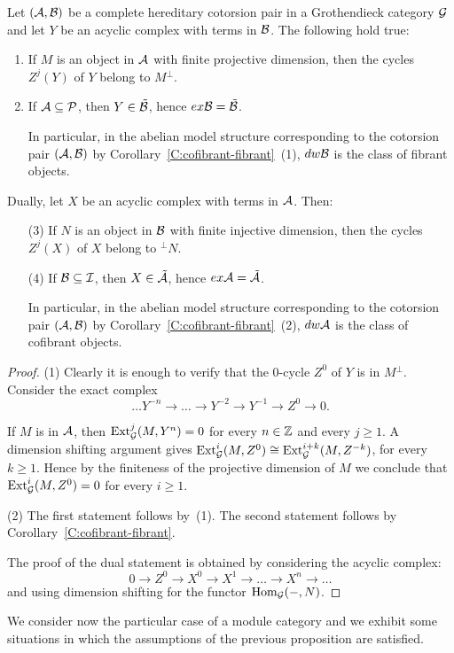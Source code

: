   \begin{prop}\label{P:finite-proj-dim} Let $(\mathcal{A}, \mathcal{B})$ be a complete hereditary cotorsion pair in a Grothendieck category $\mathcal{G}$ and let $Y$ be an acyclic complex with terms in $\mathcal{B}$. The following hold true:
  \begin{enumerate}
  \item If $M$ is an object in $\mathcal{A}$ with finite projective dimension, then the cycles $Z^j(Y)$ of $Y$ belong to $M{}^\perp{}$.
  \item If $\mathcal{A}\subseteq \mathcal{P}$, then $Y\in \tilde {\mathcal{B}}$, hence $ex\mathcal{B}=\tilde {\mathcal{B}}$.

    In particular, in the abelian model structure corresponding to the cotorsion pair $(\mathcal{A}, \mathcal{B})$ by Corollary~\ref{C:cofibrant-fibrant}~(1), $dw \mathcal{B}$ is the class of fibrant objects.
  \end{enumerate}

   Dually, let $X$ be an acyclic complex with terms in $\mathcal{A}$. Then:
   \begin{enumerate}
  \item[(3)] If $N$ is an object in $\mathcal{B}$ with finite injective dimension, then the cycles $Z^j(X)$ of $X$ belong to ${^\perp N}$.
  \item[(4)] If $\mathcal{B}\subseteq \mathcal{I}$, then $X\in \tilde {\mathcal{A}}$, hence $ex\mathcal{A}=\tilde {\mathcal{A}}$.

    In particular, in the abelian model structure corresponding to the cotorsion pair $(\mathcal{A}, \mathcal{B})$ by Corollary~\ref{C:cofibrant-fibrant}~(2), $dw \mathcal{A}$ is the class of cofibrant objects.

  \end{enumerate}

  \end{prop}

  \begin{proof} (1) Clearly it is enough to verify that the $0$-cycle $Z^0$ of $Y$ is in $M{}^\perp{}$.  Consider the exact complex
  \[\dots Y^{-n}\to\dots  \to Y^{-2}\to Y^{-1}\to Z^0\to 0.\]
  \begin{sloppypar}
  If $M$ is in $ \mathcal{A}$, then $\operatorname{Ext}^j_{\mathcal{G}}(M, Y^n)=0$ for every $n\in \mathbb{Z}$ and every $j\geq 1$. A dimension shifting argument gives ${\operatorname{Ext}^i_{\mathcal{G}}(M, Z^0)\cong \operatorname{Ext}^{i+k}_{\mathcal{G}}(M, Z^{-k})}$, for every $k\geq 1$. Hence by the finiteness of the projective dimension of $M$   we conclude that $\operatorname{Ext}^i_{\mathcal{G}}(M, Z^0)=0$ for every $i\geq 1$.
  \end{sloppypar}

 (2) The first statement  follows by~(1). The second statement follows by Corollary~\ref{C:cofibrant-fibrant}.

 The proof of the dual statement is obtained by considering the acyclic complex:
 \[0\to Z^0\to X^0\to X^1\to \dots\to X^n\to \dots\]
 and using dimension shifting for the functor $\operatorname{Hom}_{\mathcal{G}}(- ,N)$.

\end{proof}
We consider now the particular case of a module category and
 we exhibit some situations in which the assumptions of the previous proposition are satisfied.

